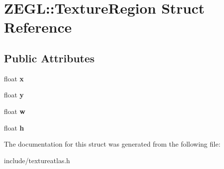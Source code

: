 \hypertarget{struct_z_e_g_l_1_1_texture_region}{}\section{Z\+E\+G\+L\+:\+:Texture\+Region Struct Reference}
\label{struct_z_e_g_l_1_1_texture_region}
\subsection*{Public Attributes}
\begin{DoxyCompactItemize}
\item 
\hypertarget{struct_z_e_g_l_1_1_texture_region_a776089615c6024fe3caf49015652d7b0}{}float {\bfseries x}\label{struct_z_e_g_l_1_1_texture_region_a776089615c6024fe3caf49015652d7b0}

\item 
\hypertarget{struct_z_e_g_l_1_1_texture_region_a18d02a5caa744b525aae3c43a2a67e84}{}float {\bfseries y}\label{struct_z_e_g_l_1_1_texture_region_a18d02a5caa744b525aae3c43a2a67e84}

\item 
\hypertarget{struct_z_e_g_l_1_1_texture_region_a7a7b2967b9fa0480e0ed88e0b212cf0b}{}float {\bfseries w}\label{struct_z_e_g_l_1_1_texture_region_a7a7b2967b9fa0480e0ed88e0b212cf0b}

\item 
\hypertarget{struct_z_e_g_l_1_1_texture_region_a264c0547f1c253a4da16d05eed235920}{}float {\bfseries h}\label{struct_z_e_g_l_1_1_texture_region_a264c0547f1c253a4da16d05eed235920}

\end{DoxyCompactItemize}


The documentation for this struct was generated from the following file\+:\begin{DoxyCompactItemize}
\item 
include/textureatlas.\+h\end{DoxyCompactItemize}
